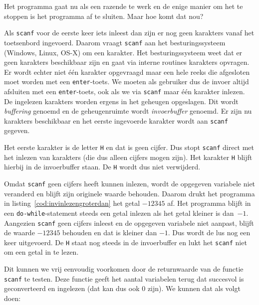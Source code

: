 Het programma gaat nu als een razende te werk en de enige manier om het te stoppen is het programma af te sluiten. Maar hoe komt dat nou?

Als \texttt{scanf} voor de eerste keer iets inleest dan zijn er nog geen karakters vanaf het toetsenbord ingevoerd. Daarom vraagt \texttt{scanf} aan het besturingssysteem (Windows, Linux, OS-X) om een karakter. Het besturingssysteem weet dat er geen karakters beschikbaar zijn en gaat via interne routines karakters opvragen. Er wordt echter niet \'e\'en karakter opgevraagd maar een hele reeks die afgesloten moet worden met een \texttt{enter}-toets. We moeten als gebruiker dus de invoer altijd afsluiten met een \texttt{enter}-toets, ook als we via \texttt{scanf} maar \'e\'en karakter inlezen. De ingelezen karakters worden ergens in het geheugen opgeslagen. Dit wordt \textsl{buffering} genoemd en de geheugenruimte wordt \textsl{invoerbuffer} genoemd. Er zijn nu karakters beschikbaar en het eerste ingevoerde karakter wordt aan \texttt{scanf} gegeven.

Het eerste karakter is de letter \texttt{H} en dat is geen cijfer. Dus stopt \texttt{scanf} direct met het inlezen van karakters (die dus alleen cijfers mogen zijn). Het karakter \texttt{H} blijft hierbij in de invoerbuffer staan. De \texttt{H} wordt dus niet verwijderd.

Omdat \texttt{scanf} geen cijfers heeft kunnen inlezen, wordt de opgegeven variabele niet veranderd en blijft zijn originele waarde behouden. Daarom drukt het programma in listing~\ref{cod:invinlezengroterdan} het getal $-12345$ af. Het programma blijft in een \texttt{do-while}-statement steeds een getal inlezen als het getal kleiner is dan~$-1$. Aangezien \texttt{scanf} geen cijfers inleest en de opgegeven variabele niet aanpast, blijft de waarde $-12345$ behouden en dat is kleiner dan $-1$. Dus wordt de lus nog een keer uitgevoerd. De \texttt{H} staat nog steeds in de invoerbuffer en lukt het \texttt{scanf} niet om een getal in te lezen.

Dit kunnen we vrij eenvoudig voorkomen door de returnwaarde van de functie \texttt{scanf} te testen. Deze functie geeft het aantal variabelen terug dat succesvol is geconverteerd en ingelezen (dat kan dus ook 0 zijn). We kunnen dat als volgt doen:

